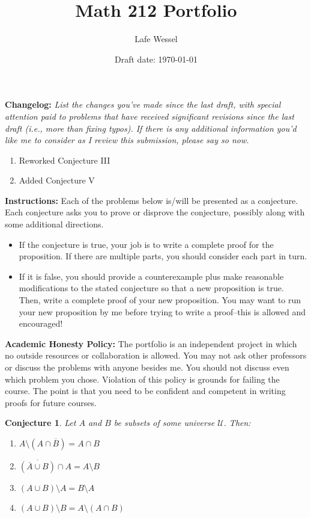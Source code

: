 \documentclass[11pt,titlepage]{article}		%
\title{\sc Math 212 Portfolio}
\author{Lafe Wessel}
\date{Draft date: \today}
\theoremstyle{theorem}
\newtheorem{conjecture}[theorem]{Conjecture}
\begin{document}
\maketitle


\noindent\textbf{Changelog:} \emph{List the changes you've made since the last draft, with special attention paid to problems that have received significant revisions since the last draft (i.e., more than fixing typos). If there is any additional information you'd like me to consider as I review this submission, please say so now.}

\begin{enumerate}
\item Reworked Conjecture III
\item Added Conjecture V
\end{enumerate}

\noindent\textbf{Instructions:} Each of the problems below is/will be presented as a conjecture. Each conjecture asks you to prove or disprove the conjecture, possibly along with some additional directions. 

\bigskip

\begin{itemize}  
	\item If the conjecture is true, your job is to write a complete proof for the proposition. If there are multiple parts, you should consider each part in turn.
	\item If it is false, you should provide a counterexample plus make reasonable modifications to the stated conjecture so that a new proposition is true. Then, write a complete proof of your new proposition. You may want to run your new proposition by me before trying to write a proof--this is allowed and encouraged!
\end{itemize}


\noindent\textbf{Academic Honesty Policy:}
The portfolio is an independent project in which no outside resources or collaboration is allowed. You may not ask other professors or discuss the problems with anyone besides me. You should not discuss even which problem you chose. Violation of this policy is grounds for failing the course. The point is that you need to be confident and competent in writing proofs for future courses.






\clearpage

\begin{conjecture}
	Let $A$ and $B$ be subsets of some universe $\mathcal{U}$.
	Then:
	\begin{enumerate}
		\item $A\setminus (A\cap \overline{B}) = A\cap B$
		\item $\overline{(\overline{A}\cup B)} \cap A = A\setminus B$
		\item $(A\cup B)\setminus A = B\setminus A$
		\item $(A\cup B) \setminus B = A\setminus (A\cap B)$
	\end{enumerate}
\end{conjecture}
\end{document}
